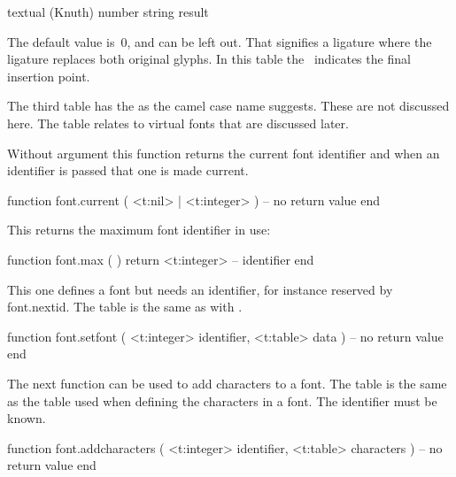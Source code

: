 \starttabulate[|l|c|l|l|]
\FL
\BC textual (Knuth)       \BC number \BC string        \BC result      \NC \NR
\ML
\NC {}           \NC \type{=:}     \NC {}   \NC \NR
\NC {}          \NC \type{=:|}    \NC {}  \NC \NR
\NC {}          \NC \type{|=:}    \NC {}  \NC \NR
\NC {}         \NC \type{|=:|}   \NC {} \NC \NR
\NC {}        \NC \type{=:|>}   \NC {}  \NC \NR
\NC {}         \NC \type{|=:>}   \NC {}  \NC \NR
\NC {}        \NC \type{|=:|>}  \NC {} \NC \NR
\NC {}      \NC \type{|=:|>>} \NC {} \NC \NR
\LL
\stoptabulate

The default value is~0, and can be left out. That signifies a 
ligature where the ligature replaces both original glyphs. In this table the~\type {|}
indicates the final insertion point.

The third table has the  as the camel case name suggests.
These are not discussed here. The  table relates to virtual fonts
that are discussed later.

\stopsection

\startsection[title=Helpers]

Without argument this function returns the current font identifier and when
an identifier is passed that one is made current.

\starttyping [option=LUA]
function font.current ( <t:nil> | <t:integer> )
    -- no return value
end
\stoptyping

This returns the maximum font identifier in use:

\starttyping [option=LUA]
function font.max ( )
    return <t:integer> -- identifier
end
\stoptyping

This one defines a font but needs an identifier, for instance reserved by \type
{font.nextid}. The table is the same as with .

\starttyping [option=LUA]
function font.setfont ( <t:integer> identifier, <t:table> data )
    -- no return value
end
\stoptyping

The next function can be used to add characters to a font. The table is the same
as the table used when defining the characters in a font. The identifier must be
known.

\starttyping [option=LUA]
function font.addcharacters ( <t:integer> identifier, <t:table> characters )
    -- no return value
end
\stoptyping

